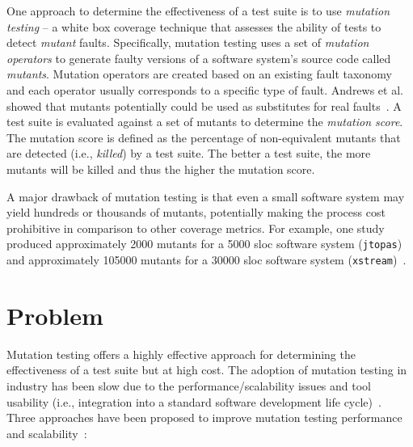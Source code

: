 One approach to determine the effectiveness of a test suite is to use \emph{mutation testing} -- a white box coverage technique that assesses the ability of tests to detect \emph{mutant} faults. Specifically, mutation testing uses a set of \emph{mutation operators} to generate faulty versions of a software system's source code called \emph{mutants}. Mutation operators are created based on an existing fault taxonomy and each operator usually corresponds to a specific type of fault. Andrews et al. showed that mutants potentially could be used as substitutes for real faults~\cite{ABLN06}. A test suite is evaluated against a set of mutants to determine the \emph{mutation score}. The mutation score is defined as the percentage of non-equivalent mutants that are detected (i.e., \emph{killed}) by a test suite. The better a test suite, the more mutants will be killed and thus the higher the mutation score.

A major drawback of mutation testing is that even a small software system may yield hundreds or thousands of mutants, potentially making the process cost prohibitive in comparison to other coverage metrics. For example, one study produced approximately 2000 mutants for a 5000 \gls{sloc} software system (\texttt{jtopas}) and approximately 105000 mutants for a 30000 \gls{sloc} software system (\texttt{xstream})~\cite{SZ09}.


\section{Problem}
\label{sec:introduction_problem}
Mutation testing offers a highly effective approach for determining the effectiveness of a test suite but at high cost. The adoption of mutation testing in industry has been slow due to the performance/scalability issues and tool usability (i.e., integration into a standard software development life cycle)~\cite{OU01}. Three approaches have been proposed to improve mutation testing performance and scalability~\cite{OU01}:

